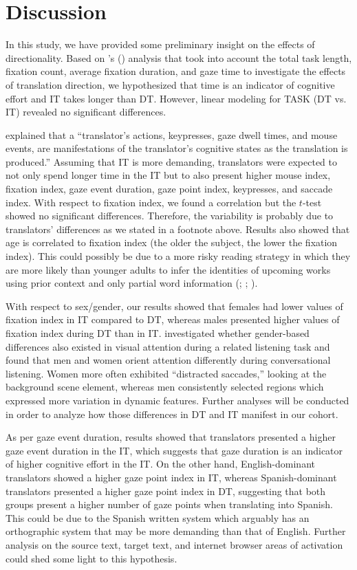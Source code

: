 \documentclass[output=paper]{langscibook}
\begin{document}
\clearpage
\section{Discussion}
In this study, we have provided some preliminary insight on the effects of directionality. Based on \citeauthor{ferreira2016cognitive}’s (\citeyear{ferreira2016cognitive}) analysis that took into account the total task length, fixation count, average fixation duration, and gaze time to investigate the effects of translation direction, we hypothesized that time is an indicator of cognitive effort and IT takes longer than DT. However, linear modeling for TASK (DT vs. IT) revealed no significant differences.

\citet{carl2016computational} explained that a “translator’s actions, keypresses, gaze dwell times, and mouse events, are manifestations of the translator’s cognitive states as the translation is produced.” Assuming that IT is more demanding, translators were expected to not only spend longer time in the IT but to also present higher mouse index, fixation index, gaze event duration, gaze point index, keypresses, and saccade index. With respect to fixation index, we found a correlation but the $t$-test showed no significant differences. Therefore, the variability is probably due to translators’ differences as we stated in a footnote above. Results also showed that age is correlated to fixation index (the older the subject, the lower the fixation index). This could possibly be due to a more risky reading strategy in which they are more likely than younger adults to infer the identities of upcoming works using prior context and only partial word information (\citealt{rayner2009eye}; \citealt{rayner2013eye}; \citealt{wang2018adult}).

With respect to sex/gender, our results showed that females had lower values of fixation index in IT compared to DT, whereas males presented higher values of fixation index during DT than in IT. \citet{shen2012top} investigated whether gender-based differences also existed in visual attention during a related listening task and found that men and women orient attention differently during conversational listening. Women more often exhibited “distracted saccades,” looking at the background scene element, whereas men consistently selected regions which expressed more variation in dynamic features. Further analyses will be conducted in order to analyze how those differences in DT and IT manifest in our cohort. 

As per gaze event duration, results showed that translators presented a higher gaze event duration in the IT, which suggests that gaze duration is an indicator of higher cognitive effort in the IT. On the other hand, English-dominant translators showed a higher gaze point index in IT, whereas Spanish-dominant translators presented a higher gaze point index in DT, suggesting that both groups present a higher number of gaze points when translating into Spanish. This could be due to the Spanish written system which arguably has an orthographic system that may be more demanding than that of English. Further analysis on the source text, target text, and internet browser areas of activation could shed some light to this hypothesis. 
\end{document}
